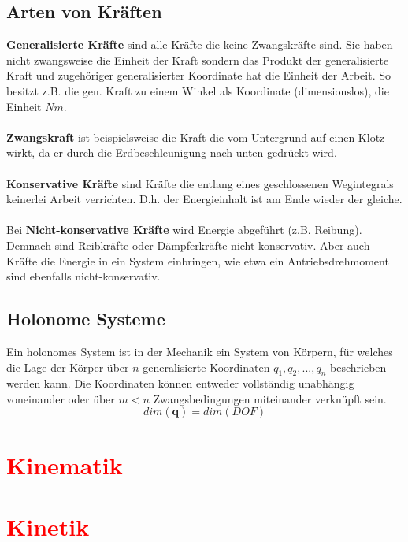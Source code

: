 	\subsection{Arten von Kräften}
		\textbf{Generalisierte Kräfte} sind alle Kräfte die keine Zwangskräfte sind. Sie haben nicht zwangsweise die Einheit der Kraft sondern das Produkt der generalisierte Kraft und zugehöriger generalisierter Koordinate hat die Einheit der Arbeit. So besitzt z.B. die gen. Kraft zu einem Winkel als Koordinate (dimensionslos), die Einheit $ Nm $.\\\\
		\textbf{Zwangskraft} ist beispielsweise die Kraft die vom Untergrund auf einen Klotz wirkt, da er durch die Erdbeschleunigung nach unten gedrückt wird.\\\\
		\textbf{Konservative Kräfte} sind Kräfte die entlang eines geschlossenen Wegintegrals keinerlei Arbeit verrichten. D.h. der Energieinhalt ist am Ende wieder der gleiche. \\\\
		Bei \textbf{Nicht-konservative Kräfte} wird Energie abgeführt (z.B. Reibung). Demnach sind Reibkräfte oder Dämpferkräfte nicht-konservativ. Aber auch Kräfte die Energie in ein System einbringen, wie etwa ein Antriebsdrehmoment sind ebenfalls nicht-konservativ.
	\subsection{Holonome Systeme}
		Ein holonomes System ist in der Mechanik ein System von Körpern, für welches die Lage der Körper über $ n $ generalisierte Koordinaten $ q_{1},q_{2},...,q_{n} $ beschrieben werden kann. Die Koordinaten können entweder vollständig unabhängig voneinander oder über $ m<n $ Zwangsbedingungen miteinander verknüpft sein. 
		\[dim(\bm{q})=dim(DOF)\]
		
		
\section{\textcolor{red}{Kinematik}}
\section{\textcolor{red}{Kinetik}}
